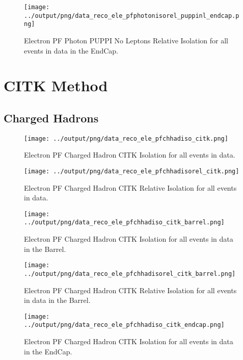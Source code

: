 \documentclass[11pt]{book}
\begin{document}
\begin{figure}[htb]
\centering
\texttt{[image: ../output/png/data\_reco\_ele\_pfphotonisorel\_puppinl\_endcap.png]}
\caption{Electron PF Photon PUPPI No Leptons Relative Isolation for all events in data in the EndCap.}
\label{fig:data_ele_pfphotonisorel_puppinl_endcap}
\end{figure}
\clearpage

\section{CITK Method}
\subsection{Charged Hadrons}
\begin{figure}[htb]
\centering
\texttt{[image: ../output/png/data\_reco\_ele\_pfchhadiso\_citk.png]}
\caption{Electron PF Charged Hadron CITK Isolation for all events in data.}
\label{fig:data_ele_pfchhadiso_citk}
\end{figure}

\begin{figure}[htb]
\centering
\texttt{[image: ../output/png/data\_reco\_ele\_pfchhadisorel\_citk.png]}
\caption{Electron PF Charged Hadron CITK Relative Isolation for all events in data.}
\label{fig:data_ele_pfchhadisorel_citk}
\end{figure}

\begin{figure}[htb]
\centering
\texttt{[image: ../output/png/data\_reco\_ele\_pfchhadiso\_citk\_barrel.png]}
\caption{Electron PF Charged Hadron CITK Isolation for all events in data in the Barrel.}
\label{fig:data_ele_pfchhadiso_citk_barrel}
\end{figure}

\begin{figure}[htb]
\centering
\texttt{[image: ../output/png/data\_reco\_ele\_pfchhadisorel\_citk\_barrel.png]}
\caption{Electron PF Charged Hadron CITK Relative Isolation for all events in data in the Barrel.}
\label{fig:data_ele_pfchhadisorel_citk_barrel}
\end{figure}

\begin{figure}[htb]
\centering
\texttt{[image: ../output/png/data\_reco\_ele\_pfchhadiso\_citk\_endcap.png]}
\caption{Electron PF Charged Hadron CITK Isolation for all events in data in the EndCap.}
\label{fig:data_ele_pfchhadiso_citk_endcap}
\end{figure}
\end{document}
